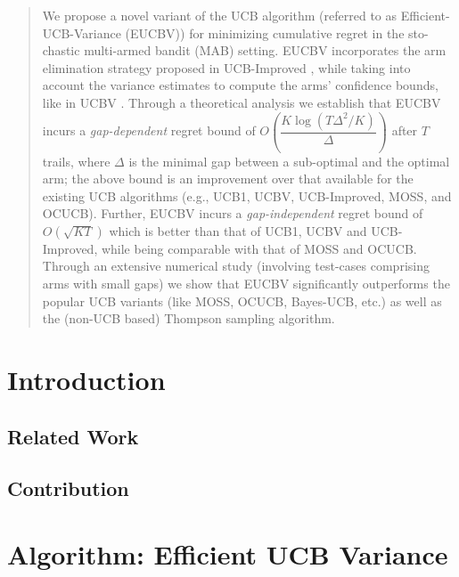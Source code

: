 \documentclass{llncs}
\begin{document}
\begin{abstract}
We propose a novel variant of the UCB algorithm (referred to as Efficient-UCB-Variance (EUCBV)) for minimizing cumulative regret in the sto- chastic multi-armed bandit (MAB) setting. EUCBV incorporates the arm elimination strategy proposed in UCB-Improved \citep{auer2010ucb}, while taking into account the variance estimates to compute the arms' confidence bounds, like in UCBV \citep{audibert2009exploration}. Through a theoretical analysis we establish that EUCBV incurs a \emph{gap-dependent} regret bound of {\scriptsize $O\left( \dfrac{K\log (T\Delta^2 /K)}{\Delta}\right)$} after $T$ trails, where $\Delta$ is the minimal gap between a sub-optimal and the optimal arm; the above bound is an improvement over that available for the existing UCB algorithms (e.g.,  UCB1, UCBV, UCB-Improved,  MOSS, and OCUCB). Further, EUCBV incurs a \emph{gap-independent} regret bound of {\scriptsize $O\left(\sqrt{KT}\right)$}  which is better than that of UCB1, UCBV and UCB-Improved, while being comparable with that of MOSS and OCUCB. Through an extensive numerical study (involving test-cases comprising arms with small gaps) we show that EUCBV significantly outperforms the popular UCB variants (like MOSS, OCUCB, Bayes-UCB, etc.) as well as the (non-UCB based) Thompson sampling algorithm. 

\end{abstract}

\section{Introduction}
\label{sec:intro}


\subsection{Related Work}
\label{sec:related}



\subsection{Contribution}
\label{sec:contri}


\section{Algorithm: Efficient UCB Variance}
\label{sec:eucbv}

\end{document}
